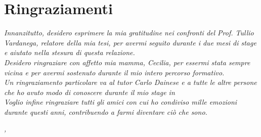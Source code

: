 
\cleardoublepage
{}
{}

\begingroup
\let\clearpage\relax
\let\cleardoublepage\relax

\chapter*{Ringraziamenti}


\noindent \textit{Innanzitutto, desidero esprimere la mia gratitudine nei confronti del Prof. Tullio Vardanega, relatore della mia tesi, per avermi seguito durante i due mesi di stage e aiutato nella stesura di questa relazione.}\\

\noindent \textit{Desidero ringraziare con affetto mia mamma, Cecilia, per essermi stata sempre vicina e per avermi sostenuto durante il mio intero percorso formativo.}\\

\noindent \textit{Un ringraziamento particolare va al tutor Carlo Dainese e a tutte le altre persone che ho avuto modo di conoscere durante il mio stage in \nomeAzienda}\\

\noindent \textit{Voglio infine ringraziare tutti gli amici con cui ho condiviso mille emozioni durante questi anni, contribuendo a farmi diventare ciò che sono.}

\bigskip

\noindent \textit{\luogo, \dataDiscussione}
\hfill \autore

\endgroup